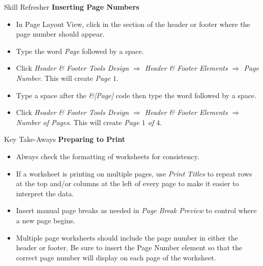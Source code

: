 \begin{center}
	\begin{sklbox}{Skill Refresher}
		\textbf{Inserting Page Numbers}
		\\
		\begin{itemize}
			\setlength{\itemsep}{0pt}
			\setlength{\parskip}{0pt}
			\setlength{\parsep}{0pt}

			\item In Page Layout View, click in the section of the header or footer where the page number should appear.
			\item Type the word \textit{Page} followed by a space.
			\item Click \textit{Header \& Footer Tools Design $ \Rightarrow $ Header \& Footer Elements $ \Rightarrow $ Page Number}. This will create \textit{Page $ 1 $}.
			\item Type a space after the \textit{\&[Page]} code then type the word  followed by a space. 
			\item Click \textit{Header \& Footer Tools Design $ \Rightarrow $ Header \& Footer Elements $ \Rightarrow $ Number of Pages}. This will create \textit{Page $ 1 $ of $ 4 $}.
			
		\end{itemize}
	\end{sklbox}
\end{center}

\begin{center}
	\begin{tkwbox}{Key Take-Aways}
		\textbf{Preparing to Print}
		\\
		\begin{itemize}
			\setlength{\itemsep}{0pt}
			\setlength{\parskip}{0pt}
			\setlength{\parsep}{0pt}

			\item Always check the formatting of worksheets for consistency.
			\item If a worksheet is printing on multiple pages, use \textit{Print Titles} to repeat rows at the top and/or columns at the left of every page to make it easier to interpret the data.
			\item Insert manual page breaks as needed in \textit{Page Break Preview} to control where a new page begins.
			\item Multiple page worksheets should include the page number in either the header or footer. Be sure to insert the Page Number element so that the correct page number will display on each page of the worksheet.
			
		\end{itemize}
	\end{tkwbox}
\end{center}

